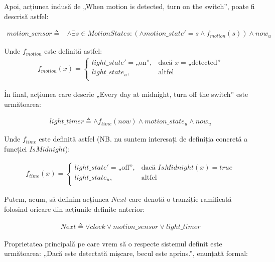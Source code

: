 Apoi, acțiunea indusă de „When motion is detected, turn on the switch”, poate fi descrisă astfel:

\begin{align*}
    motion\_sensor \triangleq &\wedge \exists s \in MotionStates : (
        \wedge motion\_state' = s \wedge f_{motion}(s)
    ) \wedge now_u
\end{align*}

Unde $f_{motion}$ este definită astfel:
\begin{gather*}
    f_{motion}(x) = \left\{
        \begin{array}{ll}
              light\_state' = \text{„on”}, & \text{dacă } x = \text{„detected”} \\
              light\_state_u, & \text{altfel} \\
        \end{array} 
        \right. 
\end{gather*}

În final, acțiunea care descrie „Every day at midnight, turn off the switch” este următoarea:

\begin{align*}
    light\_timer \triangleq \wedge f_{time}(now) \wedge motion\_state_u \wedge now_u
\end{align*}

Unde $f_{time}$ este definită astfel (NB. nu suntem interesați de definiția concretă a funcției $IsMidnight$):

\begin{align*}
    f_{time}(x) = \left\{
        \begin{array}{ll}
              light\_state' = \text{„off”}, & \text{dacă } IsMidnight(x) = true \\
              light\_state_u, & \text{altfel} \\
        \end{array} 
        \right. 
\end{align*}

Putem, acum, să definim acțiunea $Next$ care denotă o tranziție ramificată folosind oricare din acțiunile definite anterior:

\begin{align*}
    Next \triangleq \vee clock \vee motion\_sensor \vee light\_timer
\end{align*}

Proprietatea principală pe care vrem să o respecte sistemul definit este următoarea: „Dacă este detectată mișcare, becul este aprins.”, enunțată formal:

